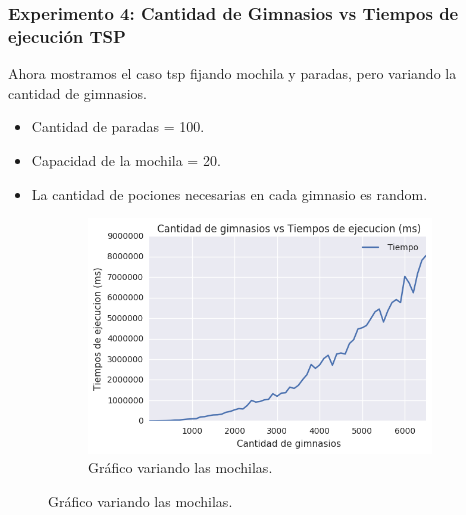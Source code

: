 \subsubsection{Experimento 4: Cantidad de Gimnasios vs Tiempos de ejecución TSP}

Ahora mostramos el caso tsp fijando mochila y paradas, pero variando la cantidad de gimnasios.

\begin{itemize}
\item Cantidad de paradas = 100.
\item Capacidad de la mochila = 20.
\item La cantidad de pociones necesarias en cada gimnasio es random.
\end{itemize}

\begin{figure}[H]
  \begin{center}	
    \begin{subfigure}[b]{0.49\textwidth}
        \includegraphics[width=\textwidth]{img/ejercicio2/losPosta/grafico_sin_log.png}
        \caption{Gráfico variando las mochilas.}
        \label{fig: ejercicio1_ejemplo_camino1_2}
 \end{subfigure}
 

\end{center}
\end{figure}
